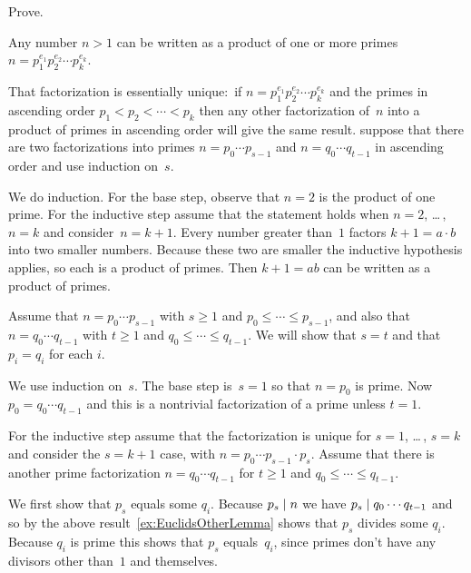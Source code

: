 \documentclass{ibl}
\begin{document}
\begin{ex}  Prove.
\begin{exes}
\item Any number $n>1$ can be written as a product of one or more primes
$n=p_1^{e_1}p_2^{e_2}\cdots p_k^{e_k}$.
\item That factorization is essentially unique:~if 
$n=p_1^{e_1}p_2^{e_2}\cdots p_k^{e_k}$ and the primes
in ascending order $p_1<p_2<\cdots<p_k$ then any other
factorization of~$n$ into a product of primes in ascending order will give the
same result. 
\hint suppose that there are two factorizations into primes $n=p_0\cdots p_{s-1}$
and $n=q_0\cdots q_{t-1}$ in ascending order and use induction on~$s$.     
\end{exes}
\begin{ans}
\begin{exes}
\item We do induction.
For the base step, observe that $n=2$ is the product of one prime. 
For the inductive step assume that the statement holds when $n=2$, \ldots\,, 
$n=k$ and consider~$n=k+1$.
Every number greater than~$1$ factors $k+1=a\cdot b$ into two smaller
numbers.
Because these two are smaller
the inductive hypothesis applies, so each is a product of 
primes.
Then $k+1=ab$ can be written as a product of primes.
\item Assume that $n=p_0\cdots p_{s-1}$ with $s\geq 1$ and
$p_0\leq\cdots \leq p_{s-1}$, 
and also that $n=q_0\cdots q_{t-1}$ with $t\geq 1$ 
and $q_0\leq\cdots \leq q_{t-1}$.
We will show that $s=t$ and that $p_i=q_i$ for each $i$.

We use induction on~$s$.
The base step is~$s=1$ so that $n=p_0$ is prime.
Now $p_0=q_0\cdots q_{t-1}$ and this is a nontrivial factorization of a prime
unless $t=1$.

For the inductive step assume that the factorization is unique for
$s=1$, \ldots\,, $s=k$ and consider the $s=k+1$ case, with
$n=p_0\cdots p_{s-1}\cdot p_s$.   
Assume that there is another prime factorization $n=q_0\cdots q_{t-1}$
for $t\geq 1$ and $q_0\leq\cdots \leq q_{t-1}$.

We first show that $p_s$ equals some $q_i$.
Because $p_s\mid n$ we have $p_s\mid q_0\cdots q_{t-1}$ and so
by the above result~\ref{ex:EuclidsOtherLemma} shows that
$p_s$ divides some $q_i$.
Because $q_i$ is prime this shows that $p_s$ equals~$q_i$,
since primes don't have any divisors other than~$1$ and themselves.


\end{exes}
\end{ans}
\end{ex}
\end{document}
